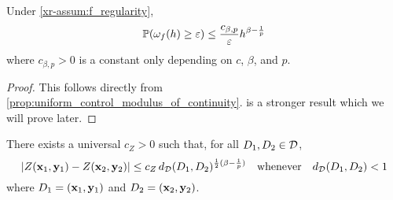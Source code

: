 \documentclass[12pt, twoside]{report}
\newcommand{\xrprefix}[1]{xr-#1}
\begin{document}
\begin{proposition}
    Under \cref{\xrprefix{assum:f_regularity}},
    \begin{equation}
        \mathbb{P}(\omega_f(h) \ge \varepsilon) \le \frac{c_{\beta, p}}{\varepsilon} h^{\beta - \frac{1}{p}}
    \end{equation}
    where $c_{\beta, p} > 0$ is a constant only depending on $c$, $\beta$, and $p$.
\end{proposition}
\begin{proof}
    This follows directly from \cref{prop:uniform_control_modulus_of_continuity}.
     is a stronger result which we will prove later.
\end{proof}

\begin{proposition} \label{prop:Lipschitzness_Z}
    There exists a universal $c_Z > 0$ such that, for all $D_1, D_2 \in \mathcal{D}$,
    \begin{equation}
        \lvert Z(\mathbf{x}_1, \mathbf{y}_1) - Z(\mathbf{x}_2, \mathbf{y}_2)\rvert
        \le c_Z\, d_{\mathcal{D}}(D_1, D_2)^{\frac12(\beta - \frac1p)}
        \quad\text{whenever}\quad
        d_{\mathcal{D}}(D_1,D_2) < 1
    \end{equation}
    where $D_1 = (\mathbf{x}_1, \mathbf{y}_1)$ and $D_2 = (\mathbf{x}_2, \mathbf{y}_2)$.
\end{proposition}
\end{document}
